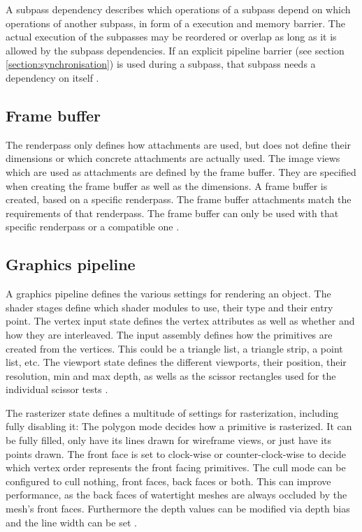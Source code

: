 A subpass dependency describes which operations of a subpass depend on which operations of another subpass, in form of a execution and memory barrier. The actual execution of the subpasses may be reordered or overlap as long as it is allowed by the subpass dependencies. If an explicit pipeline barrier (see section \ref{section:synchronisation}) is used during a subpass, that subpass needs a dependency on itself \cite{khronos:vulkan:spec1.1}.

\subsection{Frame buffer}
The renderpass only defines how attachments are used, but does not define their dimensions or which concrete attachments are actually used. The image views which are used as attachments are defined by the frame buffer. They are specified when creating the frame buffer as well as the dimensions. A frame buffer is created, based on a specific renderpass. The frame buffer attachments match the requirements of that renderpass. The frame buffer can only be used with that specific renderpass or a compatible one \cite{khronos:vulkan:spec1.1}.


\subsection{Graphics pipeline}
A graphics pipeline defines the various settings for rendering an object. The shader stages define which shader modules to use, their type and their entry point. The vertex input state defines the vertex attributes as well as whether and how they are interleaved. The input assembly defines how the primitives are created from the vertices. This could be a triangle list, a triangle strip, a point list, etc. The viewport state defines the different viewports, their position, their resolution, min and max depth, as wells as the scissor rectangles used for the individual scissor tests \cite{khronos:vulkan:spec1.1}.

The rasterizer state defines a multitude of settings for rasterization, including fully disabling it: The polygon mode decides how a primitive is rasterized. It can be fully filled, only have its lines drawn for wireframe views, or just have its points drawn. The front face is set to clock-wise or counter-clock-wise to decide which vertex order represents the front facing primitives. The cull mode can be configured to cull nothing, front faces, back faces or both. This can improve performance, as the back faces of watertight meshes are always occluded by the mesh's front faces. Furthermore the depth values can be modified via depth bias and the line width can be set \cite{khronos:vulkan:spec1.1}.

